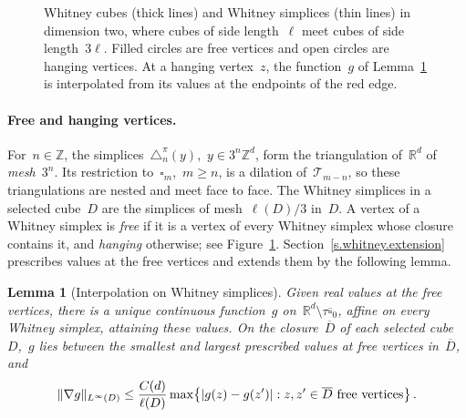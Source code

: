 \documentclass[11pt,letterpaper]{article}
\numberwithin{equation}{section}
\newtheorem{lemma}[theorem]{Lemma}
\theoremstyle{definition}
\newcommand{\Z}{\mathbb{Z}}
\newcommand{\Rd}{\mathbb{R}^d}
\newcommand{\Zd}{\mathbb{Z}^d}
\newcommand{\cu}{\square}
\DeclarePairedDelimiter{\norm}{\lVert}{\rVert}
\begin{document}
\smallskip

\begin{figure}[t]
\centering
{}
\caption{Whitney cubes (thick lines) and Whitney simplices (thin lines) in dimension two, where cubes of side length~$\ell$ meet cubes of side length~$3\ell$. Filled circles are free vertices and open circles are hanging vertices. At a hanging vertex~$z$, the function~$g$ of Lemma~\ref{l.whitney.interpolation} is interpolated from its values at the endpoints of the red edge.}
\label{f.whitney.vertices}
\end{figure}

\paragraph{Free and hanging vertices.} For~$n\in\Z$, the simplices~$\triangle_n^\pi(y)$,~$y\in3^n\Zd$, form the triangulation of~$\Rd$ of \emph{mesh}~$3^n$. Its restriction to~$\cu_m$,~$m\geq n$, is a dilation of~$\mathscr T_{m-n}$, so these triangulations are nested and meet face to face. The Whitney simplices in a selected cube~$D$ are the simplices of mesh~$\ell(D)/3$ in~$D$. A vertex of a Whitney simplex is \emph{free} if it is a vertex of every Whitney simplex whose closure contains it, and \emph{hanging} otherwise; see Figure~\ref{f.whitney.vertices}. Section~\ref{s.whitney.extension} prescribes values at the free vertices and extends them by the following lemma.

\begin{lemma}[Interpolation on Whitney simplices]
\label{l.whitney.interpolation}
Given real values at the free vertices, there is a unique continuous function~$g$ on~$\Rd\setminus\tau\overline{\cu}_0$, affine on every Whitney simplex, attaining these values. On the closure~$\overline D$ of each selected cube~$D$,~$g$ lies between the smallest and largest prescribed values at free vertices in~$\overline D$, and
\begin{equation}
	\norm{\nabla g}_{L^\infty(D)}\leq\frac{C(d)}{\ell(D)}\max\bigl\{|g(z)-g(z')|:z,z'\in\overline D\mbox{ free vertices}\bigr\}\,.
	\label{e.interpolation.gradient}
\end{equation}
\end{lemma}
\end{document}
